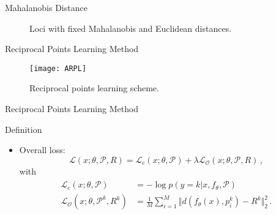 \begin{frame}{Mahalanobis Distance}
\begin{minipage}{0.49\textwidth}
\begin{figure}[h]
{
              }
              \caption*{\footnotesize{  Loci with fixed Mahalanobis and Euclidean distances.}} %
          \end{figure}
  \end{minipage}
\end{frame}

\begin{frame}{Reciprocal Points Learning Method}
  \begin{figure}
      \centering
      \texttt{[image: ARPL]}
      \caption*{Reciprocal points learning scheme.}
  \end{figure}
\end{frame}

\begin{frame}{Reciprocal Points Learning Method}
    \begin{definitionblock}{Definition}
        \begin{itemize}
          \item Overall loss: 
          \[
              \mathcal{L}(x; \theta, \mathcal{P}, R) = \mathcal{L}_c(x; \theta, \mathcal{P}) + \lambda \mathcal{L}_{\mathcal{O}}(x; \theta, \mathcal{P}, R)\,,
          \]
          with
          \begin{align*}
              \begin{aligned}
                  \mathcal{L}_c(x;\theta, \mathcal{P}) &= -\log p(y=k|x, f_{\theta}, \mathcal{P}) \\
                  \mathcal{L}_{\mathcal{O}}(x; \theta, \mathcal{P}^k, R^k) &= \frac{1}{M}\sum_{i=1}^M \Vert d(f_{\theta}(x), p_i^k)-R^k \Vert^2_2\,.
              \end{aligned}
          \end{align*}
        \end{itemize}
    \end{definitionblock}
\end{frame}

